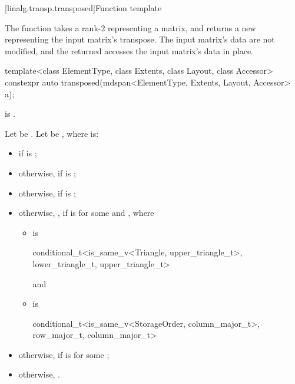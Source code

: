 [linalg.transp.transposed]{Function template }

\pnum
The  function
takes a rank-2  representing a matrix, and
returns a new  representing the input matrix's transpose.
The input matrix's data are not modified, and
the returned  accesses the input matrix's data in place.
\begin{itemdecl}
  template<class ElementType, class Extents, class Layout, class Accessor>
    constexpr auto transposed(mdspan<ElementType, Extents, Layout, Accessor> a);
\end{itemdecl}

\begin{itemdescr}
\pnum
\mandates
{} is .

\pnum
Let  be
.
Let  be
,
where  is:
\begin{itemize}
\item
{} if  is ;
\item
otherwise,  if  is ;
\item
otherwise,  if  is ;
\item
otherwise,
,
if  is\newline
{}
for some  and , where
\begin{itemize}
\item
{} is
\begin{codeblock}
conditional_t<is_same_v<Triangle, upper_triangle_t>,
              lower_triangle_t, upper_triangle_t>
\end{codeblock}
and
\item
{} is
\begin{codeblock}
conditional_t<is_same_v<StorageOrder, column_major_t>, row_major_t, column_major_t>
\end{codeblock}
\end{itemize}
\item
otherwise, 
if  is 
for some ;
\item
otherwise, .
\end{itemize}


\end{itemdescr}
